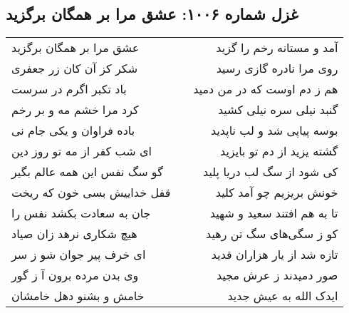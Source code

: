 \begin{center}
\section*{غزل شماره ۱۰۰۶: عشق مرا بر همگان برگزید}
\label{sec:1006}
\begin{longtable}{l p{0.5cm} r}
عشق مرا بر همگان برگزید
&&
آمد و مستانه رخم را گزید
\\
شکر کز آن کان زر جعفری
&&
روی مرا نادره گازی رسید
\\
باد تکبر اگرم در سرست
&&
هم ز دم اوست که در من دمید
\\
کرد مرا خشم مه و بر رخم
&&
گنبد نیلی سره نیلی کشید
\\
باده فراوان و یکی جام نی
&&
بوسه پیاپی شد و لب ناپدید
\\
ای شب کفر از مه تو روز دین
&&
گشته یزید از دم تو بایزید
\\
گو سگ نفس این همه عالم بگیر
&&
کی شود از سگ لب دریا پلید
\\
قفل خداییش بسی خون که ریخت
&&
خونش بریزیم چو آمد کلید
\\
جان به سعادت بکشد نفس را
&&
تا به هم افتند سعید و شهید
\\
هیچ شکاری نرهد زان صیاد
&&
کو ز سگی‌های سگ تن رهید
\\
ای خرف پیر جوان شو ز سر
&&
تازه شد از یار هزاران قدید
\\
وی بدن مرده برون آ ز گور
&&
صور دمیدند ز عرش مجید
\\
خامش و بشنو دهل خامشان
&&
ایدک الله به عیش جدید
\\
\end{longtable}
\end{center}
